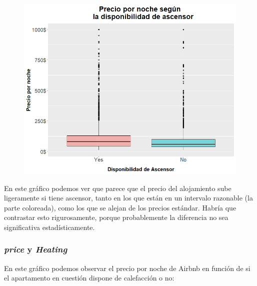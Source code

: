 \documentclass{article}
\begin{document}
\vspace{0.35cm}
\begin{figure}[h]
\hspace*{-0.15cm}
\centering
\includegraphics[scale = 0.6]{boxplot_precio_Elevator}
\end{figure}
\vspace{0.15cm}

En este gráfico podemos ver que parece que el precio del alojamiento sube ligeramente si tiene ascensor, tanto en los que están en un intervalo razonable (la parte coloreada), como los que se alejan de los precios estándar. Habría que contrastar esto rigurosamente, porque probablemente la diferencia no sea significativa estadísticamente.

\clearpage
\subsubsection{\emph{price} y \emph{Heating}}

En este gráfico podemos observar el precio por noche de Airbnb en función de si el apartamento en cuestión dispone de calefacción o no:
\end{document}
